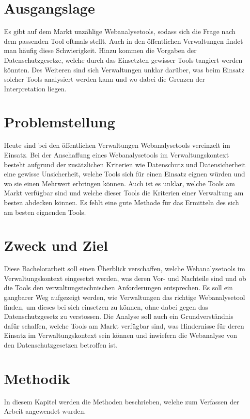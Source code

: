 
\section{Ausgangslage}
Es gibt auf dem Markt unzählige Webanalysetools, sodass sich die Frage nach dem passenden Tool oftmals stellt. Auch in den öffentlichen Verwaltungen findet man häufig diese Schwierigkeit. Hinzu kommen die Vorgaben der Datenschutzgesetze, welche durch das Einsetzten gewisser Tools tangiert werden könnten. Des Weiteren sind sich Verwaltungen unklar darüber, was beim Einsatz solcher Tools analysiert werden kann und wo dabei die Grenzen der Interpretation liegen.

\section{Problemstellung}

Heute sind bei den öffentlichen Verwaltungen Webanalysetools vereinzelt im Einsatz. Bei der Anschaffung eines Webanalysetools im Verwaltungskontext besteht aufgrund der zusätzlichen Kriterien wie Datenschutz und Datensicherheit eine gewisse Unsicherheit, welche Tools sich für einen Einsatz eignen würden und wo sie einen Mehrwert erbringen können. Auch ist es unklar, welche Tools am Markt verfügbar sind und welche dieser Tools die Kriterien einer Verwaltung am besten abdecken können. Es fehlt eine gute Methode für das Ermitteln des sich am besten eignenden Tools.

\section{Zweck und Ziel}
Diese Bachelorarbeit soll einen Überblick verschaffen, welche Webanalysetools im Verwaltungskontext eingesetzt werden, was deren Vor- und Nachteile sind und ob die Tools den verwaltungstechnischen Anforderungen entsprechen. Es soll ein gangbarer Weg aufgezeigt werden, wie Verwaltungen das richtige Webanalysetool finden, um dieses bei sich einsetzen zu können, ohne dabei gegen das Datenschutzgesetz zu verstossen. Die Analyse soll auch ein Grundverständnis dafür schaffen, welche Tools am Markt verfügbar sind, was Hindernisse für deren Einsatz im Verwaltungskontext sein können und inwiefern die Webanalyse von den Datenschutzgesetzen betroffen ist.

\newpage
\section{Methodik}
In diesem Kapitel werden die Methoden beschrieben, welche zum Verfassen der Arbeit angewendet wurden. 


